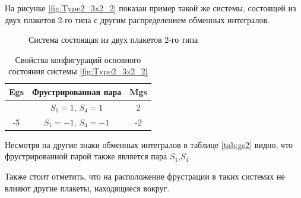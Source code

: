 \documentclass[utf8, babel, sor, jor, amsmath, amssymb, reprint]{elsarticle} %
\begin{document}
На рисунке \eqref{fig:Type2_3x2_2} показан пример такой же системы, состоящей из двух плакетов 2-го типа с другим распределением обменных интегралов.

\begin{figure}[H]
	\centering
	\begin{minipage}{0.3\textwidth}
		\centering
		\caption{Система состоящая из двух плакетов 2-го типа}
		\label{fig:Type2_3x2_2}
	\end{minipage}
\end{figure}


\begin{table}[H]
	\centering
	\begin{tabular}{|c|c|c|}
		\hline
		Egs   &   Фрустрированная пара & Mgs \\
		\hline
		&  $S_1=1$, $S_4=1$ & 2 \\
		\cline{2-3}
		-5	\multirow{3}{*}{}
		&   $S_1=-1$, $S_4=-1$ & -2 \\
		\hline
	\end{tabular}
	\caption{Свойства конфигураций основного состояния системы \eqref{fig:Type2_3x2_2}}
	\label{tab:gs2}
\end{table}

Несмотря на другие знаки обменных интегралов в таблице \eqref{tab:gs2} видно, что фрустрированной парой также является пара $S_1$,$S_4$.

Также стоит отметить, что на расположение фрустрации в таких системах  не влияют другие плакеты, находящиеся вокруг.
\end{document}
